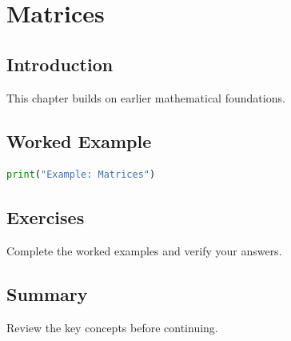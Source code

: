 \chapter{Matrices}
\label{chap:vol4-10}



\section{Introduction}
This chapter builds on earlier mathematical foundations.

\section{Worked Example}
\begin{lstlisting}[language=Python]
print("Example: Matrices")
\end{lstlisting}

\section{Exercises}
\begin{exercise}
Complete the worked examples and verify your answers.
\end{exercise}

\section{Summary}
Review the key concepts before continuing.
